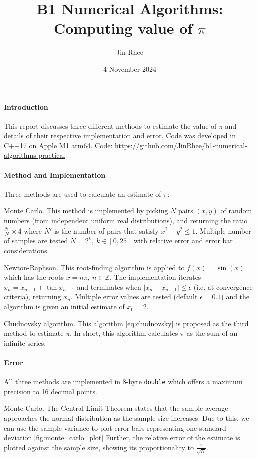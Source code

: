 \documentclass[11pt]{article}
\title{B1 Numerical Algorithms: Computing value of $\pi$}
\author{Jin Rhee}
\date{4 November 2024}
\begin{document}
\maketitle

\thispagestyle{empty}
\paragraph{Introduction} This report discusses three different methods to estimate the value of $\pi$ and details of their respective implementation and error.
Code was developed in C++17 on Apple M1 arm64. Code: \url{https://github.com/JinRhee/b1-numerical-algorithms-practical}
\paragraph{Method and Implementation}
Three methods are used to calculate an estimate of $
\pi$:
    
\par{Monte Carlo.}
This method is implemented by picking $N$ pairs $(x,y)$ of random numbers (from independent uniform real distributions),
and returning the ratio $\frac{N'}{N}\times 4$ where $N'$ is the number of pairs that satisfy $x^2+y^2 \leq 1$.
Multiple number of samples are tested $N=2^{k},\ k\in[0, 25]$ with relative error and error bar considerations.
\par{Newton-Raphson.}
This root-finding algorithm is applied to $f(x) = \sin(x)$ which has the roots $x=n\pi,\ n\in \mathbb{Z}$. The implementation
iterates $x_n=x_{n-1}+\tan{x_{n-1}}$ and terminates when $|x_n - x_{n-1}| \leq \epsilon$ (i.e. at convergence criteria), returning $x_n$.
Multiple error values are tested (default $\epsilon=0.1$) and the algorithm is given an initial estimate of $x_0=2$.
\par{Chudnovsky algorithm.}
This algorithm \ref{eq:chudnovsky} is proposed as the third method to estimate $\pi$. In short, this algorithm calculates
$\pi$ as the sum of an infinite series.\cite{enwiki:1253211016}

\paragraph{Error}
All three methods are implemented in 8-byte \texttt{double} which offers a maximum precision to
16 decimal points.
\par{Monte Carlo.} The Central Limit Theorem states that the sample average approaches the normal distribution as
the sample size increases. Due to this, we can use the sample variance to plot error bars representing one standard deviation.\ref{fig:monte_carlo_plot}
Further, the relative error of the estimate is plotted against the sample size, showing its proportionality to $\frac{1}{\sqrt{N}}$.\cite{enwiki:1255738066}
\end{document}
